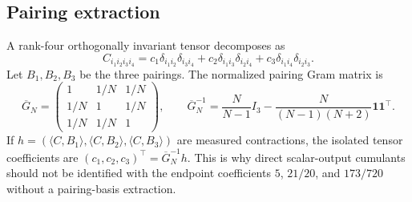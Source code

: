 \documentclass{article}
\newcommand{\one}{\mathbf 1}
\begin{document}
\subsection{Pairing extraction}
A rank-four orthogonally invariant tensor decomposes as
\begin{equation}
C_{i_1i_2i_3i_4}
=c_1\delta_{i_1i_2}\delta_{i_3i_4}
+c_2\delta_{i_1i_3}\delta_{i_2i_4}
+c_3\delta_{i_1i_4}\delta_{i_2i_3}.
\label{eq:appendix-pairing}
\end{equation}
Let \(B_1,B_2,B_3\) be the three pairings. The normalized pairing Gram matrix is
\begin{equation}
\overline G_N
=
\begin{pmatrix}
1&1/N&1/N\\
1/N&1&1/N\\
1/N&1/N&1
\end{pmatrix},
\qquad
\overline G_N^{-1}
=\frac{N}{N-1}I_3-\frac{N}{(N-1)(N+2)}\one\one^\top.
\label{eq:appendix-pairing-inv}
\end{equation}
If \(h=(\langle C,B_1\rangle,\langle C,B_2\rangle,\langle C,B_3\rangle)\) are measured contractions, the isolated tensor coefficients are \((c_1,c_2,c_3)^\top=\overline G_N^{-1}h\). This is why direct scalar-output cumulants should not be identified with the endpoint coefficients \(5\), \(21/20\), and \(173/720\) without a pairing-basis extraction.
\end{document}
